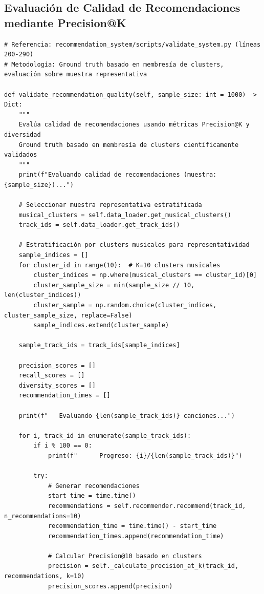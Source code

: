 \documentclass[12pt,a4paper]{article}
\begin{document}
\subsection{Evaluación de Calidad de Recomendaciones mediante Precision@K}

\begin{lstlisting}[caption={Metodología de Evaluación Precision@K con Ground Truth}]
# Referencia: recommendation_system/scripts/validate_system.py (líneas 200-290)
# Metodología: Ground truth basado en membresía de clusters, evaluación sobre muestra representativa

def validate_recommendation_quality(self, sample_size: int = 1000) -> Dict:
    """
    Evalúa calidad de recomendaciones usando métricas Precision@K y diversidad
    Ground truth basado en membresía de clusters científicamente validados
    """
    print(f"Evaluando calidad de recomendaciones (muestra: {sample_size})...")

    # Seleccionar muestra representativa estratificada
    musical_clusters = self.data_loader.get_musical_clusters()
    track_ids = self.data_loader.get_track_ids()

    # Estratificación por clusters musicales para representatividad
    sample_indices = []
    for cluster_id in range(10):  # K=10 clusters musicales
        cluster_indices = np.where(musical_clusters == cluster_id)[0]
        cluster_sample_size = min(sample_size // 10, len(cluster_indices))
        cluster_sample = np.random.choice(cluster_indices, cluster_sample_size, replace=False)
        sample_indices.extend(cluster_sample)

    sample_track_ids = track_ids[sample_indices]

    precision_scores = []
    recall_scores = []
    diversity_scores = []
    recommendation_times = []

    print(f"   Evaluando {len(sample_track_ids)} canciones...")

    for i, track_id in enumerate(sample_track_ids):
        if i % 100 == 0:
            print(f"      Progreso: {i}/{len(sample_track_ids)}")

        try:
            # Generar recomendaciones
            start_time = time.time()
            recommendations = self.recommender.recommend(track_id, n_recommendations=10)
            recommendation_time = time.time() - start_time
            recommendation_times.append(recommendation_time)

            # Calcular Precision@10 basado en clusters
            precision = self._calculate_precision_at_k(track_id, recommendations, k=10)
            precision_scores.append(precision)


\end{lstlisting}
\end{document}
